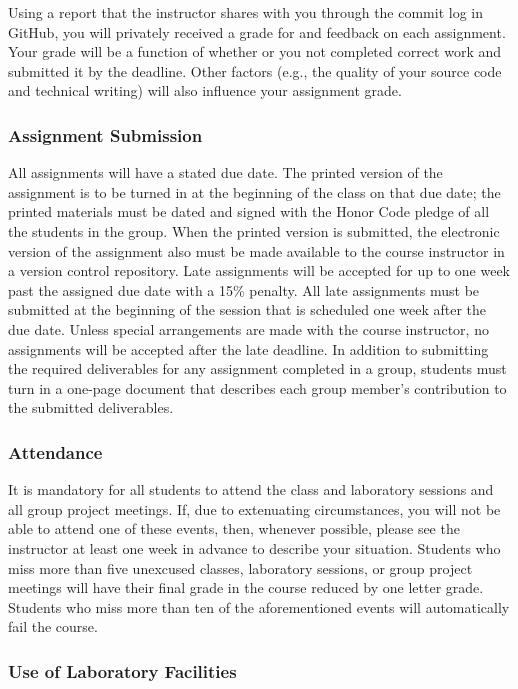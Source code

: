 \documentclass[11pt]{article}
\begin{document}
Using a report that the instructor shares with you through the commit log in GitHub, you will privately received a grade
for and feedback on each assignment. Your grade will be a function of whether or you not completed correct work and
submitted it by the deadline. Other factors (e.g., the quality of your source code and technical writing) will also
influence your assignment grade.

\subsubsection*{Assignment Submission}

All assignments will have a stated due date. The printed version of the assignment is to be turned in at the beginning
of the class on that due date; the printed materials must be dated and signed with the Honor Code pledge of all the
students in the group. When the printed version is submitted, the electronic version of the assignment also must be
made available to the course instructor in a version control repository. Late assignments will be accepted for up to one
week past the assigned due date with a 15\% penalty. All late assignments must be submitted at the beginning of the
session that is scheduled one week after the due date. Unless special arrangements are made with the course instructor,
no assignments will be accepted after the late deadline. In addition to submitting the required deliverables for any
assignment completed in a group, students must turn in a one-page document that describes each group member's
contribution to the submitted deliverables.

\subsubsection*{Attendance}

It is mandatory for all students to attend the class and laboratory sessions and all group project meetings. If, due to
extenuating circumstances, you will not be able to attend one of these events, then, whenever possible, please see the
instructor at least one week in advance to describe your situation. Students who miss more than five unexcused classes,
laboratory sessions, or group project meetings will have their final grade in the course reduced by one letter grade.
Students who miss more than ten of the aforementioned events will automatically fail the course.

\subsubsection*{Use of Laboratory Facilities}
\end{document}
